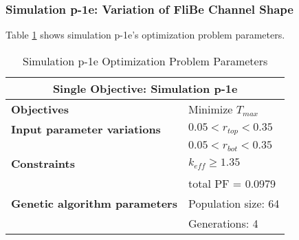 \subsubsection{Simulation p-1e: Variation of FliBe Channel Shape}
Table \ref{tab:simulationp1e} shows simulation p-1e's optimization problem parameters. 
\begin{table}[htbp!]
    \centering
    \onehalfspacing
    \caption{Simulation p-1e Optimization Problem Parameters}
	\label{tab:simulationp1e}
    \footnotesize
    \begin{tabular}{l|p{3cm}}
    \hline 
    \multicolumn{2}{c}{\textbf{Single Objective: Simulation p-1e}} \\
    \hline 
    \textbf{Objectives} & Minimize $T_{max}$ \\
    \hline 
    \textbf{Input parameter variations} & $0.05<r_{top}<0.35$ \\
    & $0.05<r_{bot}<0.35$ \\
    \hline
    \textbf{Constraints} & $k_{eff} \geq 1.35$\\ 
    & total PF = 0.0979\\
    \hline 
    \textbf{Genetic algorithm parameters} & Population size: 64 \\
    & Generations: 4 \\
    \hline
    \end{tabular}
\end{table}

